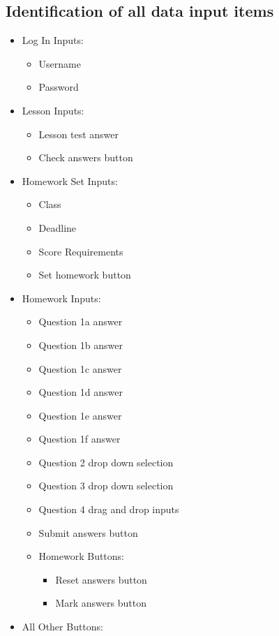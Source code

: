 \subsection{Identification of all data input items}

\begin{itemize}
	\item Log In Inputs:
	\begin{itemize}
		\item Username
		\item Password
	\end{itemize}
	\item Lesson Inputs:
	\begin{itemize}
		\item Lesson test answer
		\item Check answers button
	\end{itemize}
	\item Homework Set Inputs:
	\begin{itemize}
		\item Class
		\item Deadline
		\item Score Requirements
		\item Set homework button
	\end{itemize}
	\item Homework Inputs:
	\begin{itemize}
		\item Question 1a answer
		\item Question 1b answer
		\item Question 1c answer
		\item Question 1d answer
		\item Question 1e answer
		\item Question 1f answer
		\item Question 2 drop down selection
		\item Question 3 drop down selection
		\item Question 4 drag and drop inputs
		\item Submit answers button
		\item Homework Buttons:
		\begin{itemize}
			\item Reset answers button
			\item Mark answers button
		\end{itemize}
	\end{itemize}
	\item All Other Buttons:

\end{itemize}
